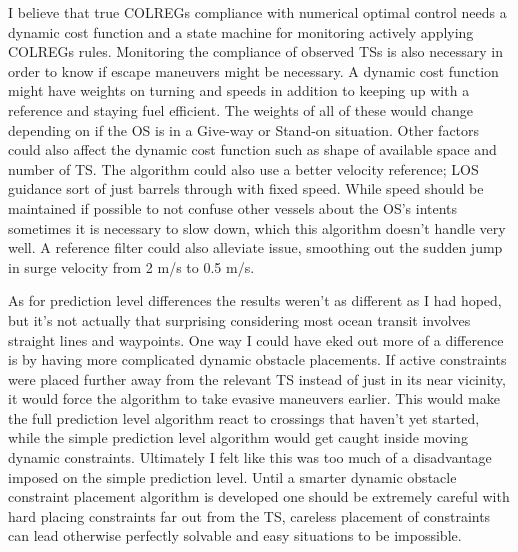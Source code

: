 I believe that true COLREGs compliance with numerical optimal control needs a dynamic cost function and a state machine for monitoring actively applying COLREGs rules.
Monitoring the compliance of observed TSs is also necessary in order to know if escape maneuvers might be necessary. A dynamic cost function might have weights on turning and speeds 
in addition to keeping up with a reference and staying fuel efficient. The weights of all of these would change depending on if the OS is in a Give-way or Stand-on situation.
Other factors could also affect the dynamic cost function such as shape of available space and number of TS. The algorithm could also use a better velocity reference; LOS guidance
sort of just barrels through with fixed speed. While speed should be maintained if possible to not confuse other vessels about the OS's intents sometimes it is necessary to slow down, which
this algorithm doesn't handle very well. A reference filter could also alleviate issue, smoothing out the sudden jump in surge velocity from 2 m/s to 0.5 m/s.

As for prediction level differences the results weren't as different as I had hoped, but it's not actually that surprising considering most ocean transit
involves straight lines and waypoints. One way I could have eked out more of a difference is by having more complicated dynamic obstacle placements. If active constraints were placed
further away from the relevant TS instead of just in its near vicinity, it would force the algorithm to take evasive maneuvers earlier. This would make the full prediction
level algorithm react to crossings that haven't yet started, while the simple prediction level algorithm would get caught inside moving dynamic constraints. Ultimately I felt like
this was too much of a disadvantage imposed on the simple prediction level. Until a smarter dynamic obstacle constraint placement algorithm is developed one should be
extremely careful with hard placing constraints far out from the TS, careless placement of constraints can lead otherwise perfectly solvable and easy situations to be impossible.

